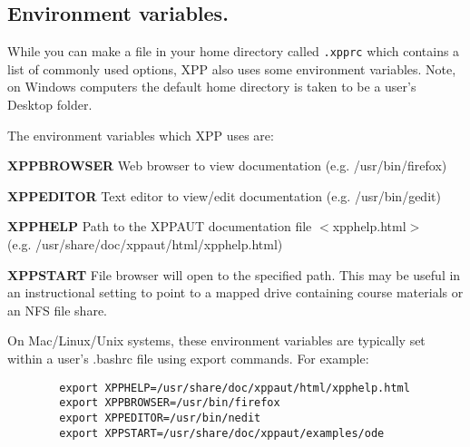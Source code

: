\documentclass{article}
\begin{document}
\subsection{Environment variables.}
While you can make a file in your home
directory called {\tt .xpprc} which contains a list of commonly used
options, XPP also uses some environment variables.  Note, on Windows computers the default
 home directory is taken to be a user's Desktop folder.

The environment variables which XPP uses are:
\begin{description}
	\item{\ttfamily\textbf{XPPBROWSER}}
              Web browser to view documentation (e.g. /usr/bin/firefox)
	\item{\ttfamily\textbf{XPPEDITOR}}
              Text editor to view/edit documentation (e.g. /usr/bin/gedit)
	\item{\ttfamily\textbf{XPPHELP}}
              Path to  the  XPPAUT  documentation  file  $<$xpphelp.html$>$\\  (e.g.
              /usr/share/doc/xppaut/html/xpphelp.html)
	\item{\ttfamily\textbf{XPPSTART}}
              File browser will open to the specified path. This may be useful
              in  an instructional setting to point to a mapped drive containing 
	      course materials or an NFS file share.
       
\end{description}



On Mac/Linux/Unix systems, these environment variables are typically set within a user's .bashrc file using export commands.  For example:
{\color{red}\begin{verbatim}
        export XPPHELP=/usr/share/doc/xppaut/html/xpphelp.html
        export XPPBROWSER=/usr/bin/firefox
        export XPPEDITOR=/usr/bin/nedit
        export XPPSTART=/usr/share/doc/xppaut/examples/ode
\end{verbatim}}
\end{document}
